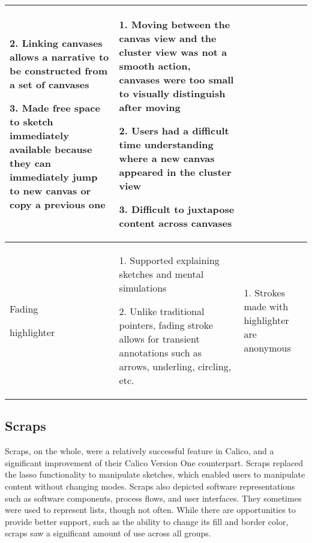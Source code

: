 \documentclass[12pt,fleqn]{ucithesis}
\begin{document}
\begin{center}
\begin{longtable}{|p{3cm}|p{6cm}|p{6cm}|}
2. Linking canvases allows a narrative to be constructed from a set of canvases

3. Made free space to sketch immediately available because they can immediately jump to new canvas or copy a previous one

&
1. Moving between the canvas view and the cluster view was not a smooth action, canvases were too small to visually distinguish after moving

2. Users had a difficult time understanding where a new canvas appeared in the cluster view

3. Difficult to juxtapose content across canvases

 \\
\hline
Fading 

highlighter &
1. Supported explaining sketches and mental simulations

2. Unlike traditional pointers, fading stroke allows for transient annotations such as arrows, underling, circling, etc.

&
1. Strokes made with highlighter are anonymous

\label{chapter:discussion:strengths-weaknesses}
\end{longtable}
\end{center}

\subsection{Scraps}
Scraps, on the whole, were a relatively successful feature in Calico, and a significant improvement of their Calico Version One counterpart. Scraps replaced the lasso functionality to manipulate sketches, which enabled users to manipulate content without changing modes. Scraps also depicted software representations such as software components, process flows, and user interfaces. They sometimes were used to represent lists, though not often. While there are opportunities to provide better support, such as the ability to change its fill and border color, scraps saw a significant amount of use across all groups. 
\end{document}
